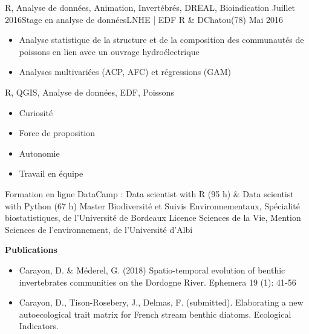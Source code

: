 \documentclass[localFont,alternative]{yaac-another-awesome-cv}
\begin{document}
\begin{experiences}
{\begin{itemize}
                      \end{itemize}
                    }
                    {R, Analyse de données, Animation, Invertébrés, DREAL, Bioindication}
  \emptySeparator
  \experience
    {Juillet 2016}{Stage en analyse de données}{LNHE | EDF R \& D}{Chatou(78)}
    {Mai 2016}    {
                      \begin{itemize}
                        \item Analyse statistique de la structure et de la composition des communautés de poissons en lien avec un ouvrage hydroélectrique
                        \item Analyses multivariées (ACP, AFC) et régressions (GAM)         
                      \end{itemize}
                    }
                    {R, QGIS,  Analyse de données, EDF, Poissons}
  \emptySeparator
  
\end{experiences}

\twocolumnsection
{
\begin{skills}
\end{skills}}
{
\vspace{1em}
\begin{itemize}
	\item Curiosité
	\item Force de proposition   
	\item Autonomie                 
    \item Travail en équipe 
\end{itemize}
}


\begin{scholarship}

					{Formation en ligne DataCamp : Data scientist with R (95 h) \& Data scientist with Python (67 h)}
					{Master Biodiversité et Suivis Environnementaux, Spécialité biostatistiques, de l'Université de Bordeaux}
					{Licence Sciences de la Vie, Mention Sciences de l'environnement, de l'Université d'Albi}
\end{scholarship}


\textbf{Publications}
\begin{itemize}
\item Carayon, D. \& Méderel, G. (2018) Spatio-temporal evolution of benthic invertebrates communities on the Dordogne River. Ephemera 19 (1): 41‑56
\item Carayon, D., Tison-Rosebery, J., Delmas, F. (submitted). Elaborating a new autoecological trait matrix for French stream benthic diatoms. Ecological Indicators.

\end{itemize}
\end{document}

